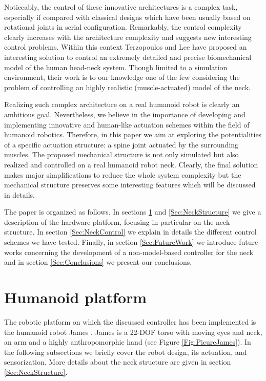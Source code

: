 \documentclass[conference]{IEEEtran}
\numberwithin{equation}{section}
\begin{document}
Noticeably, the control of these innovative architectures is a complex task, especially if compared with classical designs \cite{Kim04head,Billard05robota} which have been usually based on rotational joints in serial configuration. Remarkably, the control complexity clearly increases with the architecture complexity and suggests new interesting control problems. Within this context Terzopoulos and Lee \cite{Terzopoulos06} have proposed an interesting solution to control an extremely detailed and precise biomechanical model of the human head-neck system. Though limited to a simulation environment, their work is to our knowledge one of the few considering the problem of controlling an highly realistic (muscle-actuated) model of the neck.

Realizing such complex architecture on a real humanoid robot is clearly an ambitious goal. Nevertheless, we believe in the importance of developing and implementing innovative and human-like actuation schemes within the field of humanoid robotics. Therefore, in this paper we aim at exploring the potentialities of a specific actuation structure: a spine joint actuated by the surrounding muscles. The proposed mechanical structure is not only simulated but also realized and controlled on a real humanoid robot neck. Clearly, the final solution makes major simplifications to reduce the whole system complexity but the mechanical structure preserves some interesting features which will be discussed in details. 

The paper is organized as follows. In sections \ref{Sec:Platform} and \ref{Sec:NeckStructure} we give a description of the hardware platform, focusing in particular on the neck structure. In section \ref{Sec:NeckControl} we explain in details the different control schemes we have tested. Finally, in section \ref{Sec:FutureWork} we introduce future works concerning the development of a non-model-based controller for the neck and in section \ref{Sec:Conclusions} we present our conclusions.


\section{Humanoid platform} \label{Sec:Platform}

The robotic platform on which the discussed controller has been implemented is the humanoid robot James \cite{James06}. James is a 22-DOF torso with moving eyes and neck, an arm and a highly anthropomorphic hand (see Figure \ref{Fig:PicureJames}). In the following subsections we briefly cover the robot design, its actuation, and sensorization. More details about the neck structure are given in section \ref{Sec:NeckStructure}.
\end{document}
